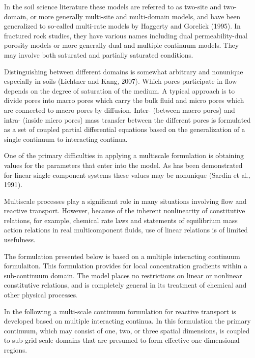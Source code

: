 \documentclass[12pt]{article}
\begin{document}
In the soil science literature these models are referred to as two-site and two-domain, or more generally multi-site and multi-domain models, and have been generalized to so-called multi-rate models by Haggerty and Gorelick (1995). In fractured rock studies, they have various names including dual permeability-dual porosity models or more generally dual and multiple continuum models. They may involve both saturated and partially saturated conditions.

Distinguishing between different domains is somewhat arbitrary and nonunique especially in soils (Lichtner and Kang, 2007). Which pores participate in flow depends on the degree of saturation of the medium. A typical approach is to divide pores into macro pores which carry the bulk fluid and micro pores which are connected to macro pores by diffusion. Inter- (between macro pores) and intra- (inside micro pores) mass transfer between the different pores is formulated as a set of coupled partial differential equations based on the generalization of a single continuum to interacting continua.

One of the primary difficulties in applying a multiscale formulation is obtaining values for the parameters that enter into the model. As has been demonstrated for linear single component systems these values may be nonunique (Sardin et al., 1991).

Multiscale processes play a significant role in many situations involving flow and reactive transport. However, because of the inherent nonlinearity of constitutive relations, for example, chemical rate laws and statements of equilibrium mass action relations in real multicomponent fluids, use of linear relations is of limited usefulness.

The formulation presented below is based on a multiple interacting continuum formulaiton. This formulation provides for local concentration gradients within a sub-continuum domain. The model places no restrictions on linear or nonlinear constitutive relations, and is completely general in its treatment of chemical and other physical processes.

In the following a multi-scale continuum formulation for reactive transport is developed based on multiple interacting continua. In this formulation the primary continuum, which may consist of one, two, or three spatial dimensions, is coupled to sub-grid scale domains that are presumed to form effective one-dimensional regions. 
\end{document}
